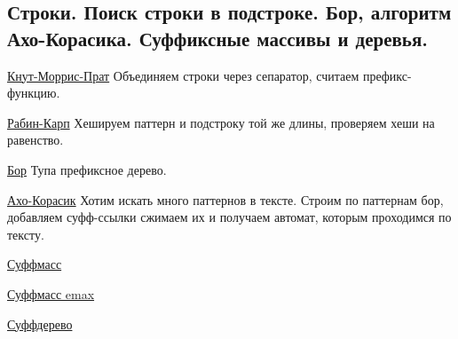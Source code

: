 \subsection{Строки. Поиск строки в подстроке. Бор, алгоритм Ахо-Корасика. Суффиксные массивы и деревья.}

\href{https://neerc.ifmo.ru/wiki/index.php?title=%D0%90%D0%BB%D0%B3%D0%BE%D1%80%D0%B8%D1%82%D0%BC_%D0%9A%D0%BD%D1%83%D1%82%D0%B0-%D0%9C%D0%BE%D1%80%D1%80%D0%B8%D1%81%D0%B0-%D0%9F%D1%80%D0%B0%D1%82%D1%82%D0%B0}{Кнут-Моррис-Прат}
Объединяем строки через сепаратор, считаем префикс-функцию.

\href{https://neerc.ifmo.ru/wiki/index.php?title=%D0%9F%D0%BE%D0%B8%D1%81%D0%BA_%D0%BF%D0%BE%D0%B4%D1%81%D1%82%D1%80%D0%BE%D0%BA%D0%B8_%D0%B2_%D1%81%D1%82%D1%80%D0%BE%D0%BA%D0%B5_%D1%81_%D0%B8%D1%81%D0%BF%D0%BE%D0%BB%D1%8C%D0%B7%D0%BE%D0%B2%D0%B0%D0%BD%D0%B8%D0%B5%D0%BC_%D1%85%D0%B5%D1%88%D0%B8%D1%80%D0%BE%D0%B2%D0%B0%D0%BD%D0%B8%D1%8F._%D0%90%D0%BB%D0%B3%D0%BE%D1%80%D0%B8%D1%82%D0%BC_%D0%A0%D0%B0%D0%B1%D0%B8%D0%BD%D0%B0-%D0%9A%D0%B0%D1%80%D0%BF%D0%B0}{Рабин-Карп}
Хешируем паттерн и подстроку той же длины, проверяем хеши на равенство.

\href{https://neerc.ifmo.ru/wiki/index.php?title=%D0%91%D0%BE%D1%80}{Бор}
Тупа префиксное дерево.

\href{https://neerc.ifmo.ru/wiki/index.php?title=%D0%90%D0%BB%D0%B3%D0%BE%D1%80%D0%B8%D1%82%D0%BC_%D0%90%D1%85%D0%BE-%D0%9A%D0%BE%D1%80%D0%B0%D1%81%D0%B8%D0%BA}{Ахо-Корасик}
Хотим искать много паттернов в тексте. Строим по паттернам бор, добавляем суфф-ссылки
сжимаем их и получаем автомат, которым проходимся по тексту.

\href{https://neerc.ifmo.ru/wiki/index.php?title=%D0%A1%D1%83%D1%84%D1%84%D0%B8%D0%BA%D1%81%D0%BD%D1%8B%D0%B9_%D0%BC%D0%B0%D1%81%D1%81%D0%B8%D0%B2}{Суффмасс}

\href{https://e-maxx.ru/algo/suffix_array}{Суффмасс emax}

\href{https://neerc.ifmo.ru/wiki/index.php?title=%D0%A1%D0%B6%D0%B0%D1%82%D0%BE%D0%B5_%D1%81%D1%83%D1%84%D1%84%D0%B8%D0%BA%D1%81%D0%BD%D0%BE%D0%B5_%D0%B4%D0%B5%D1%80%D0%B5%D0%B2%D0%BE}{Суффдерево}


